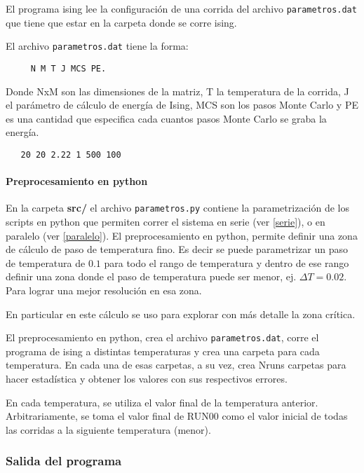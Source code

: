 El programa ising lee la configuraci\'on de una corrida del 
archivo \texttt{parametros.dat} que tiene que estar en la carpeta donde se
corre ising.

El archivo \texttt{parametros.dat} tiene la forma: 

\begin{verbatim}
     N M T J MCS PE. 
\end{verbatim}

Donde NxM 
son las dimensiones de la matriz, T la temperatura de la corrida,
J el par\'ametro de c\'alculo de energ\'ia de Ising, MCS son los pasos Monte Carlo y PE
es una cantidad que especifica cada cuantos pasos Monte Carlo se graba la energ\'ia.

\begin{verbatim}
   20 20 2.22 1 500 100
\end{verbatim}


\paragraph{Preprocesamiento en python}
En la carpeta \textbf{src/} el archivo \texttt{parametros.py} contiene la 
parametrizaci\'on de los scripts en python que permiten correr el sistema en 
serie (ver \eqref{serie}), 
o en paralelo (ver \eqref{paralelo}).
El preprocesamiento en python, permite definir una zona de c\'alculo de paso
de temperatura fino. Es decir se puede parametrizar un paso de temperatura de
$0.1$ para todo el rango de temperatura y dentro de ese rango definir una zona
donde el paso de temperatura puede ser menor, ej. $\Delta T = 0.02$. Para 
lograr una mejor resoluci\'on
en esa zona.

En particular en este c\'alculo se uso para explorar con m\'as detalle la zona
cr\'itica.

El preprocesamiento en python, crea el archivo \texttt{parametros.dat}, 
 corre el programa de ising a distintas temperaturas y crea una carpeta para 
 cada temperatura. En cada una de esas carpetas, a su vez, crea Nruns carpetas 
 para hacer estadística y obtener los valores con sus respectivos errores.
 
  En cada temperatura, se utiliza el valor final de la temperatura anterior.
  Arbitrariamente, se toma el valor final de RUN00 como el valor inicial de
  todas las corridas a la siguiente temperatura (menor).
 

\subsubsection{Salida del programa}

